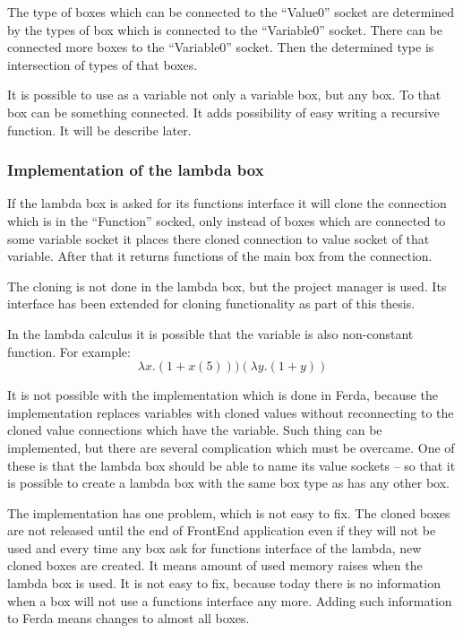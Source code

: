 \documentclass[a4paper,12pt]{book}
\begin{document}
The type of boxes which can be connected to the ``Value0'' socket are determined by the types of box which is connected to the ``Variable0'' socket. There can be connected more boxes to the ``Variable0'' socket. Then the determined type is intersection of types of that boxes.

It is possible to use as a variable not only a variable box, but any box. To that box can be something connected. It adds possibility of easy writing a recursive function. It will be describe later.   

\subsubsection{Implementation of the lambda box}
If the lambda box is asked for its functions interface it will clone the connection which is in the ``Function'' socked, only instead of boxes which are connected to some variable socket it places there cloned connection to value socket of that variable. After that it returns functions of the main box from the connection.

The cloning is not done in the lambda box, but the project manager is used. Its interface has been extended for cloning functionality as part of this thesis.

In the lambda calculus it is possible that the variable is also non-constant function. For example:
\begin{equation}
\lambda x.(1+x(5)))(\lambda y.(1+y))
\end{equation}

It is not possible with the implementation which is done in Ferda, because the implementation replaces variables with cloned values without reconnecting to the cloned value connections which have the variable. Such thing can be implemented, but there are several complication which must be overcame. One of these is that the lambda box should be able to name its value sockets -- so that it is possible to create a lambda box with the same box type as has any other box.

The implementation has one problem, which is not easy to fix. The cloned boxes are not released until the end of FrontEnd application even if they will not be used and every time any box ask for functions interface of the lambda, new cloned boxes are created. It means amount of used memory raises when the lambda box is used. It is not easy to fix, because today there is no information when a box will not use a functions interface any more. Adding such information to Ferda means changes to almost all boxes.
\end{document}

